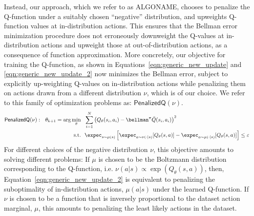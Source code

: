 Instead, our approach, which we refer to as ALGONAME, chooses to penalize the Q-function under a suitably chosen ``negative'' distribution, and upweights Q-function values at in-distribution actions.
This ensures that the Bellman error minimization procedure does not erroneously downweight the Q-values at in-distribution actions and upweight those at out-of-distribution actions, as a consequence of function approximation. More concretely, our objective for training the Q-function, as shown in Equations~\ref{eqn:generic_new_update} and \ref{eqn:generic_new_update_2} now minimizes the Bellman error, subject to explicitly up-weighting Q-values on in-distribution actions while penalizing them on actions drawn from a different distribution $\nu$, which is of our choice. We refer to this family of optimization problems as: $\mathsf{PenalizedQ(\nu)}$. 
\begin{align}
    \label{eqn:generic_new_update}
    \mathsf{PenalizedQ(\nu)}:~~ \theta_{k+1} = \arg\min_{\theta} ~~& \sum_{i=1}^N \left( Q_\theta(s_i, a_i) - \bellman^\pi \bar{Q}(s_i, a_i) \right)^2 \\ %
    \text{s.t.}~~ & \expec_{s \sim \mu(s)}\left[ \expec_{a \sim \nu(\cdot|s)} [Q_\theta(s, a)] - \expec_{a \sim \mu(\cdot|s)}[Q_\theta(s, a)] \right] \leq \varepsilon
    \label{eqn:generic_new_update_2}
\end{align}
For different choices of the negative distribution $\nu$,
this objective amounts to solving different problems: If $\mu$
is chosen to be the Boltzmann distribution corresponding to the Q-function, i.e. $\nu(a|s) \propto \exp(Q_\theta(s, a))$, then, Equation~\ref{eqn:generic_new_update_2} is equivalent to penalizing the suboptimality of in-distribution actions,
$\mu(a|s)$ under the learned Q-function. If $\nu$ is chosen to be a function that is inversely proportional to the dataset action marginal, $\mu$, this amounts to penalizing the least likely actions in the dataset.

